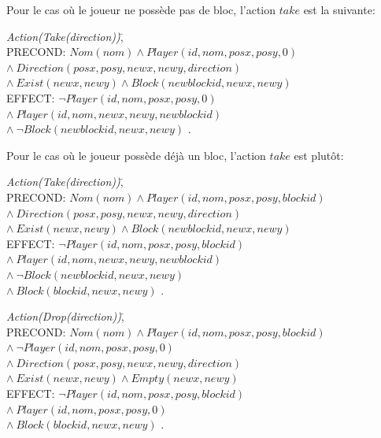 \documentclass[12pt,english,frenchb,letterpaper]{article}
\begin{document}
Pour le cas où le joueur ne possède pas de bloc, l'action $take$ est la suivante:

\begin{tabbing}
\textit{Action}\=\textit{(Take(direction))}\=,\\
\> PRECOND: \> $Nom(nom) \wedge Player(id,nom,posx,posy,0)$ \\ 
\> \> $  \wedge \ Direction(posx,posy,newx,newy,direction) $ \\
\> \> $   \wedge \ Exist(newx,newy) \wedge Block(newblockid,newx,newy) $ \\               
\> EFFECT: \>$ \lnot Player(id,nom,posx,posy,0) $ \\
\>  \> $\wedge\ Player(id,nom,newx,newy,newblockid)$ \\
\> \> $\wedge\ \lnot Block(newblockid,newx,newy) $ .\\
\end{tabbing}

Pour le cas où le joueur possède déjà un bloc, l'action $take$ est plutôt:
\begin{tabbing}
\textit{Action}\=\textit{(Take(direction))}\=,\\
\> PRECOND: \> $Nom(nom) \wedge Player(id,nom,posx,posy,blockid)$ \\ 
\> \> $  \wedge \ Direction(posx,posy,newx,newy,direction) $ \\
\> \> $   \wedge \ Exist(newx,newy) \wedge Block(newblockid,newx,newy) $ \\               
\> EFFECT: \>$ \lnot Player(id,nom,posx,posy,blockid) $ \\
\>  \> $\wedge\ Player(id,nom,newx,newy,newblockid)$ \\
\> \> $\wedge\ \lnot Block(newblockid,newx,newy) $ \\
\> \> $\wedge\ Block(blockid,newx,newy) $ .\\
\end{tabbing}

\begin{tabbing}
\textit{Action}\=\textit{(Drop(direction))}\=,\\
\> PRECOND: \> $Nom(nom) \wedge Player(id,nom,posx,posy,blockid)$ \\ 
\> \> $  \wedge \  \lnot Player(id,nom,posx,posy,0) $ \\
\> \> $  \wedge \ Direction(posx,posy,newx,newy,direction) $ \\
\> \> $   \wedge \ Exist(newx,newy) \wedge Empty(newx,newy) $ \\               
\> EFFECT: \>$ \lnot Player(id,nom,posx,posy,blockid) $ \\
\>  \> $\wedge\ Player(id,nom,posx,posy,0)$ \\
\> \> $\wedge\ Block(blockid,newx,newy) $ .\\
\end{tabbing}
\end{document}
